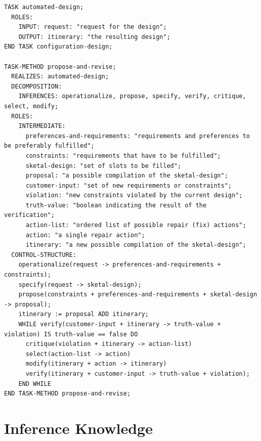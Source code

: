 \documentclass[11pt]{article} %
\begin{document}
\begin{lstlisting}[label=Task,caption=Task and task method description,breaklines=true]
TASK automated-design;
  ROLES:
    INPUT: request: "request for the design";
    OUTPUT: itinerary: "the resulting design";
END TASK configuration-design;

TASK-METHOD propose-and-revise;
  REALIZES: automated-design;
  DECOMPOSITION:
    INFERENCES: operationalize, propose, specify, verify, critique, select, modify;
  ROLES:
    INTERMEDIATE:
      preferences-and-requirements: "requirements and preferences to be preferably fulfilled";
      constraints: "requirements that have to be fulfilled";
      sketal-design: "set of slots to be filled";
      proposal: "a possible compilation of the sketal-design";
      customer-input: "set of new requirements or constraints";
      violation: "new constraints violated by the current design";
      truth-value: "boolean indicating the result of the verification";
      action-list: "ordered list of possible repair (fix) actions";
      action: "a single repair action";
      itinerary: "a new possible compilation of the sketal-design";
  CONTROL-STRUCTURE:
    operationalize(request -> preferences-and-requirements + constraints);
    specify(request -> sketal-design);
    propose(constraints + preferences-and-requirements + sketal-design -> proposal);
    itinerary := proposal ADD itinerary;
    WHILE verify(customer-input + itinerary -> truth-value + violation) IS truth-value == false DO
      critique(violation + itinerary -> action-list)
      select(action-list -> action)
      modify(itinerary + action -> itinerary)
      verify(itinerary + customer-input -> truth-value + violation);
    END WHILE
END TASK-METHOD propose-and-revise;
\end{lstlisting}

\clearpage
\section{Inference Knowledge}
\end{document}
